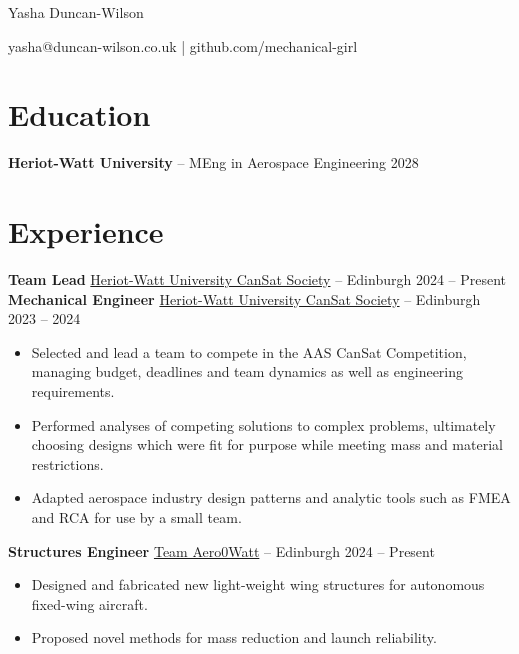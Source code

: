 \documentclass[10pt,a4paper]{article}
\begin{document}
\centerline{\Huge Yasha Duncan-Wilson}

\vspace{5pt}

\centerline{yasha@duncan-wilson.co.uk | github.com/mechanical-girl}

\vspace{-18.5pt}

\section*{Education}
\textbf{Heriot-Watt University} -- MEng in Aerospace Engineering \hfill 2028 \\

\vspace{-10pt}

\section*{Experience}
\textbf{Team Lead} \href{https://www.hwunion.com/societies/cansat/}{Heriot-Watt University CanSat Society} -- Edinburgh \hfill 2024 -- Present \\
\textbf{Mechanical Engineer} \href{https://www.hwunion.com/societies/cansat/}{Heriot-Watt University CanSat Society} -- Edinburgh \hfill 2023 -- 2024 \\
\vspace{-9pt}
\begin{itemize}
	\item Selected and lead a team to compete in the AAS CanSat Competition, managing budget, deadlines and team dynamics as well as engineering requirements.
	\item Performed analyses of competing solutions to complex problems, ultimately choosing designs which were fit for purpose while meeting mass and material restrictions.
	\item Adapted aerospace industry design patterns and analytic tools such as FMEA and RCA for use by a small team.
\end{itemize}

\textbf{Structures Engineer} \href{https://www.aero-watt.com/}{Team Aero0Watt} -- Edinburgh \hfill 2024 -- Present \\
\begin{itemize}
	\item Designed and fabricated new light-weight wing structures for autonomous fixed-wing aircraft.
	\item Proposed novel methods for mass reduction and launch reliability.
\end{itemize}
\end{document}
